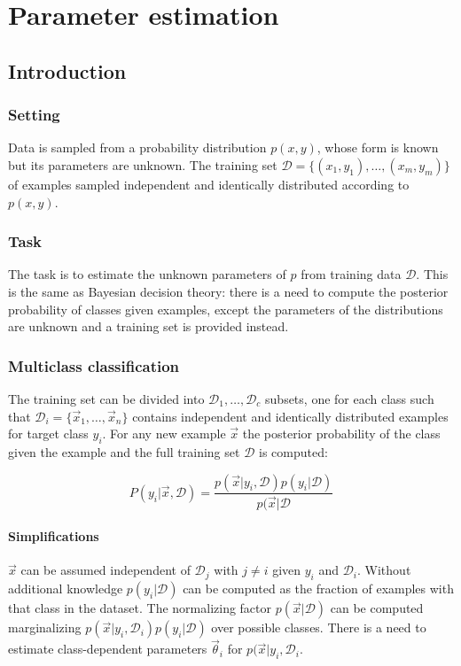 \chapter{Parameter estimation}

\section{Introduction}

	\subsection{Setting}
	Data is sampled from a probability distribution $p(x, y)$, whose form is known but its parameters are unknown.
	The training set $\mathcal{D} = \{(x_1, y_1), \dots, (x_m, y_m)\}$ of examples sampled independent and identically distributed according to $p(x,y)$.

	\subsection{Task}
	The task is to estimate the unknown parameters of $p$ from training data $\mathcal{D}$.
	This is the same as Bayesian decision theory: there is a need to compute the posterior probability of classes given examples, except the parameters of the distributions are unknown and a training set is provided instead.

	\subsection{Multiclass classification}
	The training set can be divided into $\mathcal{D}_1, \dots, \mathcal{D}_c$ subsets, one for each class such that $\mathcal{D}_i = \{\vec{x}_1, \dots, \vec{x}_n\}$ contains independent and identically distributed examples for target class $y_i$.
	For any new example $\vec{x}$ the posterior probability of the class given the example and the full training set $\mathcal{D}$ is computed:

	$$P(y_i|\vec{x}, \mathcal{D}) = \frac{p(\vec{x}|y_i, \mathcal{D})p(y_i|\mathcal{D})}{p(\vec{x}|\mathcal{D}}$$

		\subsubsection{Simplifications}
		$\vec{x}$ can be assumed independent of $\mathcal{D}_j$ with $j\neq i$ given $y_i$ and $\mathcal{D}_i$.
		Without additional knowledge $p(y_i|\mathcal{D})$ can be computed as the fraction of examples with that class in the dataset.
		The normalizing factor $p(\vec{x}|\mathcal{D})$ can be computed marginalizing $p(\vec{x}|y_i, \mathcal{D}_i)p(y_i|\mathcal{D})$ over possible classes.
		There is a need to estimate class-dependent parameters $\vec{\theta}_i$ for $p(\vec{x}|y_i, \mathcal{D}_i$.

